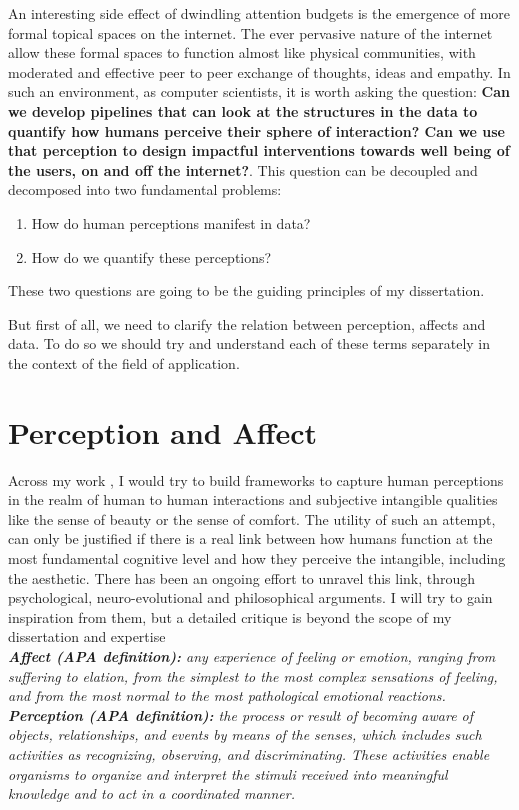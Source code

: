 An interesting side effect of dwindling attention budgets is the emergence of more formal topical spaces on the internet. The ever pervasive nature of the internet allow these formal spaces to function almost like physical communities, with moderated and effective peer to peer exchange of thoughts, ideas and empathy\cite{kummervold2002social,squire2015should,hwang2010social}.
In such an environment, as computer scientists, it is worth asking the question: \textbf{Can we develop pipelines that can look at the structures in the data to quantify how humans perceive their sphere of interaction? Can we use that perception to design impactful interventions towards well being of the users, on and off the internet?}. 
This question can be decoupled and decomposed into two fundamental problems:
\begin{enumerate}
\item How do human perceptions manifest in data? 
\item How do we quantify these perceptions?
\end{enumerate}
These two questions are going to be the guiding principles of my dissertation. 

But first of all, we need to clarify the relation between perception, affects and data. To do so we should try and understand each of these terms separately in the context of the field of application.

\section{Perception and Affect}
Across my work , I would try to build frameworks to capture human perceptions in the realm of human to human interactions and subjective intangible qualities like the sense of beauty or the sense of comfort. The utility of such an attempt, can only be justified if there is a real link between how humans function at the most fundamental cognitive level and how they perceive the intangible, including the aesthetic. There has been an ongoing effort to unravel this link, through psychological, neuro-evolutional and philosophical arguments. I will try to gain inspiration from them, but a detailed critique is beyond the scope of my dissertation and expertise\\
\textsl{\textbf{Affect (APA definition):} any experience of feeling or emotion, ranging from suffering to elation, from the simplest to the most complex sensations of feeling, and from the most normal to the most pathological emotional reactions.}\\
\textsl{\textbf{Perception (APA definition):} the process or result of becoming aware of objects, relationships, and events by means of the senses, which includes such activities as recognizing, observing, and discriminating. These activities enable organisms to organize and interpret the stimuli received into meaningful knowledge and to act in a coordinated manner.}\\

